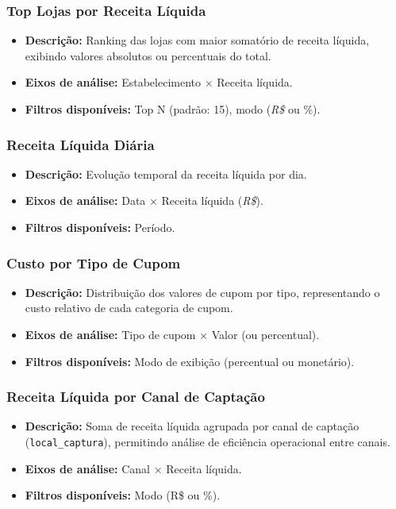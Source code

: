 \documentclass[12pt]{article}
\begin{document}
\subsubsection{Top Lojas por Receita Líquida}
\begin{itemize}
    \item \textbf{Descrição:} Ranking das lojas com maior somatório de receita líquida, exibindo valores absolutos ou percentuais do total.
    \item \textbf{Eixos de análise:} Estabelecimento × Receita líquida.
    \item \textbf{Filtros disponíveis:} Top N (padrão: 15), modo (\textit{R\$} ou \%).
\end{itemize}

\subsubsection{Receita Líquida Diária}
\begin{itemize}
    \item \textbf{Descrição:} Evolução temporal da receita líquida por dia.
    \item \textbf{Eixos de análise:} Data × Receita líquida (\textit{R\$}).
    \item \textbf{Filtros disponíveis:} Período.
\end{itemize}

\subsubsection{Custo por Tipo de Cupom}
\begin{itemize}
    \item \textbf{Descrição:} Distribuição dos valores de cupom por tipo, representando o custo relativo de cada categoria de cupom.
    \item \textbf{Eixos de análise:} Tipo de cupom × Valor (ou percentual).
    \item \textbf{Filtros disponíveis:} Modo de exibição (percentual ou monetário).
\end{itemize}

\subsubsection{Receita Líquida por Canal de Captação}
\begin{itemize}
    \item \textbf{Descrição:} Soma de receita líquida agrupada por canal de captação (\texttt{local\_captura}), permitindo análise de eficiência operacional entre canais.
    \item \textbf{Eixos de análise:} Canal × Receita líquida.
    \item \textbf{Filtros disponíveis:} Modo (R\$ ou \%).
\end{itemize}
\end{document}
